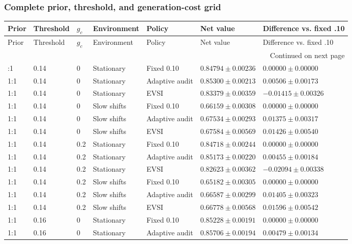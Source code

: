 \subsubsection*{Complete prior, threshold, and generation-cost grid}
\begingroup\footnotesize\setlength{\tabcolsep}{4pt}

\begin{longtable}{@{}lllllll@{}}
\toprule Prior & Threshold & $g_c$ & Environment & Policy & Net value & Difference vs. fixed .10 \\\midrule\endfirsthead
\toprule Prior & Threshold & $g_c$ & Environment & Policy & Net value & Difference vs. fixed .10 \\\midrule\endhead
\midrule\multicolumn{7}{r}{Continued on next page}\\\endfoot
\bottomrule\endlastfoot
1:1 & 0.14 & 0 & Stationary & Fixed 0.10 & $0.84794 \pm 0.00236$ & $0.00000 \pm 0.00000$ \\
1:1 & 0.14 & 0 & Stationary & Adaptive audit & $0.85300 \pm 0.00213$ & $0.00506 \pm 0.00173$ \\
1:1 & 0.14 & 0 & Stationary & EVSI & $0.83379 \pm 0.00359$ & $-0.01415 \pm 0.00326$ \\
1:1 & 0.14 & 0 & Slow shifts & Fixed 0.10 & $0.66159 \pm 0.00308$ & $0.00000 \pm 0.00000$ \\
1:1 & 0.14 & 0 & Slow shifts & Adaptive audit & $0.67534 \pm 0.00293$ & $0.01375 \pm 0.00317$ \\
1:1 & 0.14 & 0 & Slow shifts & EVSI & $0.67584 \pm 0.00569$ & $0.01426 \pm 0.00540$ \\
1:1 & 0.14 & 0.2 & Stationary & Fixed 0.10 & $0.84718 \pm 0.00244$ & $0.00000 \pm 0.00000$ \\
1:1 & 0.14 & 0.2 & Stationary & Adaptive audit & $0.85173 \pm 0.00220$ & $0.00455 \pm 0.00184$ \\
1:1 & 0.14 & 0.2 & Stationary & EVSI & $0.82623 \pm 0.00362$ & $-0.02094 \pm 0.00338$ \\
1:1 & 0.14 & 0.2 & Slow shifts & Fixed 0.10 & $0.65182 \pm 0.00305$ & $0.00000 \pm 0.00000$ \\
1:1 & 0.14 & 0.2 & Slow shifts & Adaptive audit & $0.66587 \pm 0.00299$ & $0.01405 \pm 0.00323$ \\
1:1 & 0.14 & 0.2 & Slow shifts & EVSI & $0.66778 \pm 0.00568$ & $0.01596 \pm 0.00542$ \\
1:1 & 0.16 & 0 & Stationary & Fixed 0.10 & $0.85228 \pm 0.00191$ & $0.00000 \pm 0.00000$ \\
1:1 & 0.16 & 0 & Stationary & Adaptive audit & $0.85706 \pm 0.00194$ & $0.00479 \pm 0.00134$ \\

\end{longtable}
